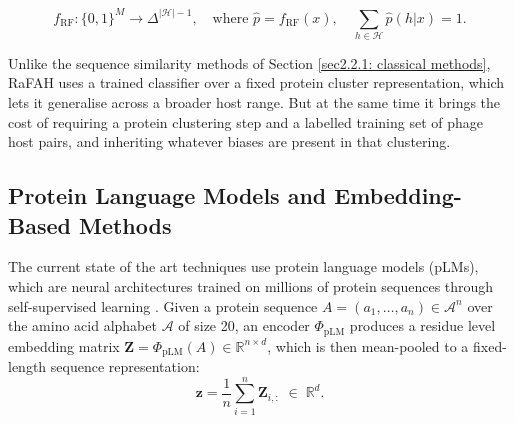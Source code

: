 \begin{equation*}
f_{\text{RF}}: \{0, 1\}^M \longrightarrow \Delta^{|\mathcal{H}|-1}, \quad \text{where } \hat{p} = f_{\text{RF}}(x), 
\quad \sum_{h \in \mathcal{H}} \hat{p}(h|x) = 1.
\end{equation*}

Unlike the sequence similarity methods of Section \ref{sec2.2.1: classical methods}, RaFAH uses a trained classifier 
over a fixed protein cluster representation, which lets it generalise across a broader host range. But at the same time 
it brings the cost of requiring a protein clustering step and a labelled training set of phage host pairs, and inheriting 
whatever biases are present in that clustering. 


\subsection{Protein Language Models and Embedding-Based Methods}
\label{sec2.2.2: plms}
\noindent The current state of the art techniques use protein language models (pLMs), which are neural architectures 
trained on millions of protein sequences through self-supervised learning \cite{elnaggar2022prottrans, flamholz2024large}. 
Given a protein sequence $A = (a_1, \ldots, a_n) \in \mathcal{A}^n$ over the amino acid alphabet $\mathcal{A}$ of size 20, 
an encoder $\Phi_{\text{pLM}}$ produces a residue level embedding matrix $\mathbf{Z} = \Phi_{\text{pLM}}(A) \in 
\mathbb{R}^{n \times d}$, which is then mean-pooled to a fixed-length sequence representation:
\begin{equation*}
\mathbf{z} = \frac{1}{n} \sum_{i=1}^{n} \mathbf{Z}_{i,:} \;\in\; \mathbb{R}^d.
\end{equation*}

